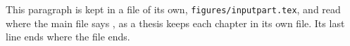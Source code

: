 This paragraph is kept in a file of its own, \texttt{figures/inputpart.tex}, and read
where the main file says \verb||, as a thesis keeps each
chapter in its own file. Its last line ends where the file ends.
